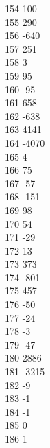 { 154	100 \\
 155	290 \\
 156	-640 \\
 157	251 \\
 158	3 \\
 159	95 \\
 160	-95 \\
 161	658 \\
 162	-638 \\
 163	4141 \\
 164	-4070 \\
 165	4 \\
 166	75 \\
 167	-57 \\
 168	-151 \\
 169	98 \\
 170	54 \\
 171	-29 \\
 172	13 \\
 173	373 \\
 174	-801 \\
 175	457 \\
 176	-50 \\
 177	-24 \\
 178	-3 \\
 179	-47 \\
 180	2886 \\
 181	-3215 \\
 182	-9 \\
 183	-1 \\
 184	-1 \\
 185	0 \\
 186	1 \\
}
